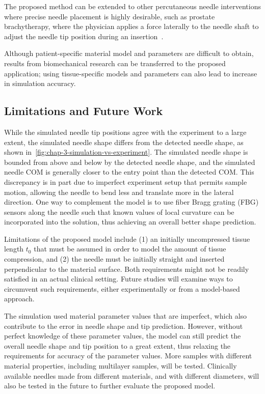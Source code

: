 The proposed method can be extended to other percutaneous needle interventions where precise needle placement is highly desirable, such as prostate brachytherapy, where the physician applies a force laterally to the needle shaft to adjust the needle tip position during an insertion~\parencite{jamaluddinIntraoperativeFactorsAssociated2017}.

Although patient-specific material model and parameters are difficult to obtain, results from biomechanical research can be transferred to the proposed application; using tissue-specific models and parameters can also lead to increase in simulation accuracy.

\subsection{Limitations and Future Work}
\label{sec:chap-3-limitations-and-future-work}

While the simulated needle tip positions agree with the experiment to a large extent, the simulated needle shape differs from the detected needle shape, as shown in~\cref{fig:chap-3-simulation-vs-experiment}. The simulated needle shape is bounded from above and below by the detected needle shape, and the simulated needle COM is generally closer to the entry point than the detected COM. This discrepancy is in part due to imperfect experiment setup that permits sample motion, allowing the needle to bend less and translate more in the lateral direction. One way to complement the model is to use fiber Bragg grating (FBG) sensors along the needle such that known values of local curvature can be incorporated into the solution, thus achieving an overall better shape prediction.

Limitations of the proposed model include (1) an initially uncompressed tissue length $t_0$ that must be assumed in order to model the amount of tissue compression, and (2) the needle must be initially straight and inserted perpendicular to the material surface. Both requirements might not be readily satisfied in an actual clinical setting. Future studies will examine ways to circumvent such requirements, either experimentally or from a model-based approach.

The simulation used material parameter values that are imperfect, which also contribute to the error in needle shape and tip prediction. However, without perfect knowledge of these parameter values, the model can still predict the overall needle shape and tip position to a great extent, thus relaxing the requirements for accuracy of the parameter values. More samples with different material properties, including multilayer samples, will be tested. Clinically available needles made from different materials, and with different diameters, will also be tested in the future to further evaluate the proposed model.

